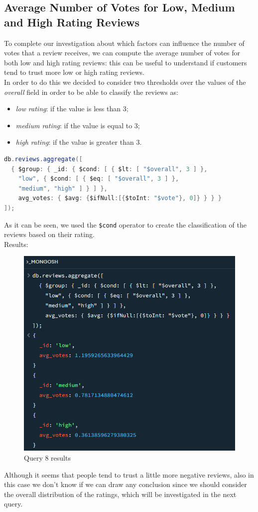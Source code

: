 \newpage
\subsection{Average Number of Votes for Low, Medium and High Rating Reviews}
To complete our investigation about which factors can influence the number of votes that a review receives, we can compute the average number of votes for both low and high rating reviews: this can be useful to understand if customers tend to trust more low or high rating reviews. \\
In order to do this we decided to consider two thresholds over the values of the \textit{overall} field in order to be able to classify the reviews as:
\begin{itemize}
    \item \textit{low rating}: if the value is less than 3;
    \item \textit{medium rating}: if the value is equal to 3;
    \item \textit{high rating}: if the value is greater than 3.
\end{itemize}
\begin{lstlisting}[language=Java]
db.reviews.aggregate([
  { $group: { _id: { $cond: [ { $lt: [ "$overall", 3 ] }, 
    "low", { $cond: [ { $eq: [ "$overall", 3 ] }, 
    "medium", "high" ] } ] }, 
    avg_votes: { $avg: {$ifNull:[{$toInt: "$vote"}, 0]} } } }
]);
\end{lstlisting}
As it can be seen, we used the \texttt{\$cond} operator to create the classification of the reviews based on their rating. \\
Results:
\begin{figure}[H]
  \centering
  \includegraphics[scale=0.55]{Images/q8_result.png}
  \caption{Query 8 results}
  \label{fig:q8_result}
\end{figure}
Although it seems that people tend to trust a little more negative reviews, also in this case we don't know if we can draw any conclusion since we should consider the overall distribution of the ratings, which will be investigated in the next query. \\

